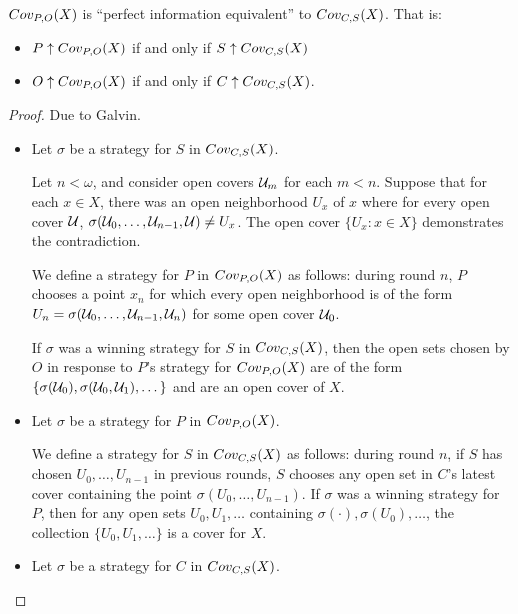   \begin{theorem} $Cov_{P,O}(X)$ is ``perfect information equivalent'' to $Cov_{C,S}(X)$. That is:

    \begin{itemize}
      \item $P\uparrow Cov_{P,O}(X)$ if and only if $S\uparrow Cov_{C,S}(X)$
      \item $O\uparrow Cov_{P,O}(X)$ if and only if $C\uparrow Cov_{C,S}(X)$.
    \end{itemize}
  \end{theorem}

  \begin{proof}
    Due to Galvin.

    \begin{itemize}
      \item
      Let $\sigma$ be a strategy for $S$ in $Cov_{C,S}(X)$. 

      Let $n<\omega$, and consider open covers $\mathcal{U}_m$ for each $m<n$. Suppose that for each $x\in X$, there was an open neighborhood $U_x$ of $x$ where for every open cover $\mathcal{U}$, $\sigma(\mathcal{U}_0,\dots,\mathcal{U}_{n-1},\mathcal{U})\not=U_x$. The open cover $\{U_x : x\in X\}$ demonstrates the contradiction.

      We define a strategy for $P$ in $Cov_{P,O}(X)$ as follows: during round $n$, $P$ chooses a point $x_n$ for which every open neighborhood is of the form $U_n = \sigma(\mathcal{U}_0,\dots,\mathcal{U}_{n-1},\mathcal{U}_n)$ for some open cover $\mathcal{U}_0$.

      If $\sigma$ was a winning strategy for $S$ in $Cov_{C,S}(X)$, then the open sets chosen by $O$ in response to $P$'s strategy for $Cov_{P,O}(X)$ are of the form $\{\sigma(\mathcal{U}_0),\sigma(\mathcal{U}_0,\mathcal{U}_1),\dots\}$ and are an open cover of $X$.

      \item
      Let $\sigma$ be a strategy for $P$ in $Cov_{P,O}(X)$.

      We define a strategy for $S$ in $Cov_{C,S}(X)$ as follows: during round $n$, if $S$ has chosen $U_0,\dots,U_{n-1}$ in previous rounds, $S$ chooses any open set in $C$'s latest cover containing the point $\sigma(U_0,\dots,U_{n-1})$. If $\sigma$ was a winning strategy for $P$, then for any open sets $U_0,U_1,\dots$ containing $\sigma(\cdot),\sigma(U_0),\dots$, the collection $\{U_0,U_1,\dots\}$ is a cover for $X$.

      \item
      Let $\sigma$ be a strategy for $C$ in $Cov_{C,S}(X)$.


\end{itemize}
\end{proof}
